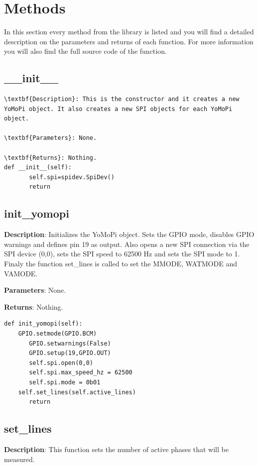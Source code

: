 \documentclass{scrartcl}  %
\begin{document}
\section{Methods}

In this section every method from the library is listed and you will find a detailed description on the parameters and returns of each function. For more information you will also find the full source code of the function.
\subsection{__init__}

\begin{lstlisting}
\textbf{Description}: This is the constructor and it creates a new YoMoPi object. It also creates a new SPI objects for each YoMoPi object.

\textbf{Parameters}: None.

\textbf{Returns}: Nothing.
def __init__(self):
       self.spi=spidev.SpiDev()
       return 
\end{lstlisting}
 
\subsection{init_yomopi}

\textbf{Description}: Initializes the YoMoPi object. Sets the GPIO mode, disables GPIO warnings and defines pin 19 as output. Also opens a new SPI connection via the SPI device (0,0), sets the SPI speed to 62500 Hz and sets the SPI mode to 1. Finaly the function set_lines is called to set the MMODE, WATMODE and VAMODE.

\textbf{Parameters}: None.

\textbf{Returns}: Nothing.

\begin{lstlisting}
def init_yomopi(self):
	GPIO.setmode(GPIO.BCM)
       GPIO.setwarnings(False)
       GPIO.setup(19,GPIO.OUT)
       self.spi.open(0,0)
       self.spi.max_speed_hz = 62500
       self.spi.mode = 0b01
	self.set_lines(self.active_lines)
       return 
\end{lstlisting}
		
\subsection{set_lines}

\textbf{Description}: This function sets the number of active phases that will be measured.
\end{document}
